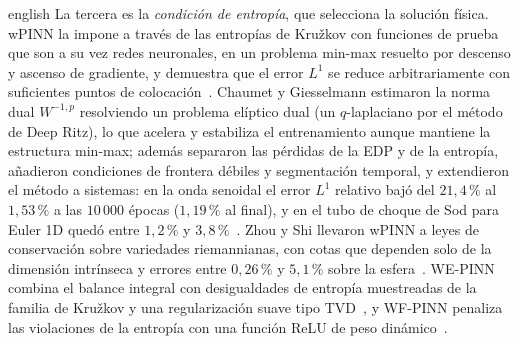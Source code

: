 \documentclass[../0000.tex]{subfiles}
\begin{document}
\begin{hyphenrules}{english}
La tercera es la \emph{condición de entropía}, que selecciona la solución física. wPINN la impone a través de las entropías de Kružkov con funciones de prueba que son a su vez redes neuronales, en un problema min-max resuelto por descenso y ascenso de gradiente, y demuestra que el error $L^1$ se reduce arbitrariamente con suficientes puntos de colocación~\cite{de2024wpinns}. Chaumet y Giesselmann estimaron la norma dual $W^{-1,p}$ resolviendo un problema elíptico dual (un $q$-laplaciano por el método de Deep Ritz), lo que acelera y estabiliza el entrenamiento aunque mantiene la estructura min-max; además separaron las pérdidas de la EDP y de la entropía, añadieron condiciones de frontera débiles y segmentación temporal, y extendieron el método a sistemas: en la onda senoidal el error $L^1$ relativo bajó del $21{,}4\,\%$ al $1{,}53\,\%$ a las $10\,000$ épocas ($1{,}19\,\%$ al final), y en el tubo de choque de Sod para Euler 1D quedó entre $1{,}2\,\%$ y $3{,}8\,\%$~\cite{chaumet2024improving}. Zhou y Shi llevaron wPINN a leyes de conservación sobre variedades riemannianas, con cotas que dependen solo de la dimensión intrínseca y errores entre $0{,}26\,\%$ y $5{,}1\,\%$ sobre la esfera~\cite{zhou2025weak}. WE-PINN combina el balance integral con desigualdades de entropía muestreadas de la familia de Kružkov y una regularización suave tipo TVD~\cite{oubarka2026weak}, y WF-PINN penaliza las violaciones de la entropía con una función ReLU de peso dinámico~\cite{wang2025wf}.


\end{hyphenrules}
\end{document}
